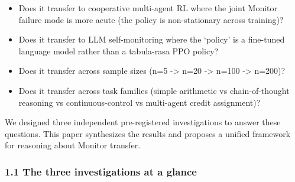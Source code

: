 \documentclass[11pt]{article}
\begin{document}
\begin{itemize}

\item
  Does it transfer to cooperative multi-agent RL where the joint Monitor
  failure mode is more acute (the policy is non-stationary across
  training)?
\item
  Does it transfer to LLM self-monitoring where the `policy' is a
  fine-tuned language model rather than a tabula-rasa PPO policy?
\item
  Does it transfer across sample sizes (n=5 -\textgreater{} n=20
  -\textgreater{} n=100 -\textgreater{} n=200)?
\item
  Does it transfer across task families (simple arithmetic vs
  chain-of-thought reasoning vs continuous-control vs multi-agent credit
  assignment)?
\end{itemize}

We designed three independent pre-registered investigations to answer
these questions. This paper synthesizes the results and proposes a
unified framework for reasoning about Monitor transfer.

\subsubsection{1.1 The three investigations at a
glance}\label{the-three-investigations-at-a-glance}
\end{document}
